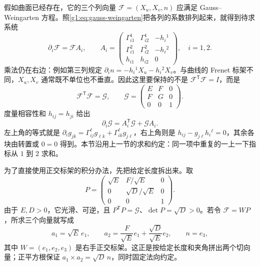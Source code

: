假如曲面已经存在，它的三个列向量 \(\mathcal F=(X_u,X_v,n)\) 应满足 Gauss–Weingarten 方程。照\eqref{g1:eq:gauss-weingarten}把各列的系数排列起来，就得到待求系统
\begin{equation}
	\label{g1:eq:surface-coordinate-frame-system}
	\partial_i\mathcal F=\mathcal F A_i,\qquad
	A_i=
	\begin{pmatrix}
		\Gamma^1_{i1}&\Gamma^1_{i2}&-h_i{}^1\\
		\Gamma^2_{i1}&\Gamma^2_{i2}&-h_i{}^2\\
		h_{i1}&h_{i2}&0
	\end{pmatrix},\quad i=1,2.
\end{equation}
乘法仍在右边：例如第三列规定 \(\partial_i n=-h_i{}^1X_u-h_i{}^2X_v\)。与曲线的 Frenet 标架不同，\(X_u,X_v\) 通常既不单位也不垂直。因此这里要保持的不是 \(\mathcal F^{\mathsf T}\mathcal F=I\)，而是
\[
	\mathcal F^{\mathsf T}\mathcal F=\mathcal G,\qquad
	\mathcal G=\begin{pmatrix}E&F&0\\F&G&0\\0&0&1\end{pmatrix}.
\]
度量相容性和 \(h_{ij}=h_{ji}\) 给出
\begin{equation}
	\label{g1:eq:surface-matrix-metric-compatibility}
	\partial_i\mathcal G=A_i^{\mathsf T}\mathcal G+\mathcal G A_i.
\end{equation}
左上角的等式就是 \(\partial_i g_{jk}=\Gamma^\ell_{ij}g_{\ell k}+\Gamma^\ell_{ik}g_{j\ell}\)，右上角则是 \(h_{ij}-g_{j\ell}h_i{}^\ell=0\)，其余各块由转置或 \(0=0\) 得到。本节沿用上一节的求和约定：同一项中重复的一上一下指标从 \(1\) 到 \(2\) 求和。

\ProseParagraphBreak

为了直接使用正交标架的积分办法，先把给定长度拆出来。取
\begin{equation}
	\label{g1:eq:surface-metric-factor}
	P=
	\begin{pmatrix}
		\sqrt E&F/\sqrt E&0\\
		0&\sqrt D/\sqrt E&0\\
		0&0&1
	\end{pmatrix}.
\end{equation}
由于 \(E,D>0\)，它光滑、可逆，且 \(P^{\mathsf T}P=\mathcal G\)、\(\det P=\sqrt D>0\)。若令 \(\mathcal F=WP\)，所求三个向量就写成
\[
	a_1=\sqrt E\,e_1,\qquad
	a_2=\frac F{\sqrt E}e_1+\frac{\sqrt D}{\sqrt E}e_2,\qquad
	n=e_3,
\]
其中 \(W=(e_1,e_2,e_3)\) 是右手正交标架。这正是按给定长度和夹角拼出两个切向量；正平方根保证 \(a_1\times a_2=\sqrt D\,n\)，同时固定法向约定。


